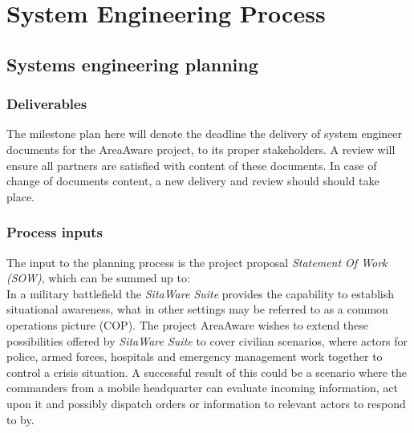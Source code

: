 %
\thispagestyle{fancy}
\chapter{System Engineering Process}
\label{chp:se_process}

\section{Systems engineering planning}

\subsection{Deliverables}
\label{plan:deliverables}
The milestone plan here will denote the deadline the delivery of system engineer documents for the AreaAware project, to its proper stakeholders.
A review will ensure all partners are satisfied with content of these documents.
In case of change of documents content, a new delivery and review should should take place.

\subsection{Process inputs}
The input to the planning process is the project proposal \emph{Statement Of Work (SOW)}, which can be summed up to: \\
In a military battlefield the \emph{SitaWare Suite} provides the capability to establish situational awareness, what in other settings may be referred to as a common operations picture (COP).
The project AreaAware wishes to extend these possibilities offered by \emph{SitaWare Suite} to cover civilian scenarios, where actors for police, armed forces, hospitals and emergency management work together to control a crisis situation.
A successful result of this could be a scenario where the commanders from a mobile headquarter can evaluate incoming information, act upon it and possibly dispatch orders or information to relevant actors to respond to by.

